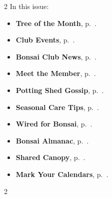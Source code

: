 \setlength{\columnsep}{-5.0cm}
\begin{multicols}{2}
    \noindent\textsf{In this issue:}
    \begin{itemize}
        \item \textsf{\textbf{Tree of the Month}}, p.~\pageref{2025-06-contest}.
        \item \textsf{\textbf{Club Events}}, p.~\pageref{2025-06-calendar}.
        \item \textsf{\textbf{Bonsai Club News}}, p.~\pageref{2025-06-news}.
        \item \textsf{\textbf{Meet the Member}}, p.~\pageref{2025-06-roots}.
        \item \textsf{\textbf{Potting Shed Gossip}}, p.~\pageref{2025-06-gossip}.
        \item \textsf{\textbf{Seasonal Care Tips}}, p.~\pageref{2025-06-care}.
        \item \textsf{\textbf{Wired for Bonsai}}, p.~\pageref{2025-06-wired}.
        \item \textsf{\textbf{Bonsai Almanac}}, p.~\pageref{2025-06-almanac}.
        \item \textsf{\textbf{Shared Canopy}}, p.~\pageref{2025-06-canopy}.
        \item \textsf{\textbf{Mark Your Calendars}}, p.~\pageref{2025-06-events}.
    \end{itemize}
    \vfill\null
    \columnbreak

    
\end{multicols}
\pagebreak

\setlength{\columnsep}{0.5cm}
\begin{multicols}{2}
    
    
    
    
    
    
    
    
    
    
    
\end{multicols}
